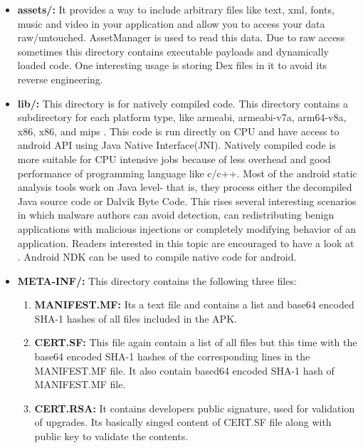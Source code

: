 \documentclass[../main.tex]{subfile}
\begin{document}
		\begin{itemize}
			\item \textbf{assets/:} It provides a way to include arbitrary files like text, xml, fonts, music and video in your application and allow you to access your data raw/untouched. AssetManager is used to read this data\cite{android_assets}. Due to raw access sometimes this directory contains executable payloads and dynamically loaded code. One interesting usage is storing Dex files in it to avoid its reverse engineering. \cite{lim2016android}
			
			\item \textbf{lib/:} This directory is for natively compiled code. This directory contains a subdirectory for each platform type, like armeabi, armeabi-v7a, arm64-v8a, x86, x86, and mips \cite{APK_structure}. This code is run directly on CPU and have access to android API using Java Native Interface(JNI). Natively compiled code is more suitable for CPU intensive jobs because of less overhead and good performance of programming language like c/c++. Most of the android  static analysis tools work on Java level- that is, they process either the decompiled Java source code or Dalvik Byte Code\cite{afonso2016going}. This rises several interesting scenarios in which malware authors can avoid detection, can redistributing benign applications with malicious injections or completely modifying behavior of an application. Readers interested in this topic are encouraged to have a look at \cite{afonso2016going}. Android NDK can be used to compile native code for android. 
			
			
			\item \textbf{META-INF/:} This directory contains the following three files:
			\begin{enumerate}
				\item \textbf{MANIFEST.MF:} Its a text file and contains a list and base64 encoded SHA-1 hashes of all files included in the APK.
				\item \textbf{CERT.SF:} This file again contain a list of all files but this time with the base64 encoded SHA-1 hashes of the corresponding lines in the MANIFEST.MF file. It also contain based64 encoded SHA-1 hash of MANIFEST.MF file.
				\item \textbf{CERT.RSA:} It contains developers public signature, used for validation of upgrades. Its basically singed content of CERT.SF file along with public key to validate the contents.
			\end{enumerate}
			

\end{itemize}
\end{document}
